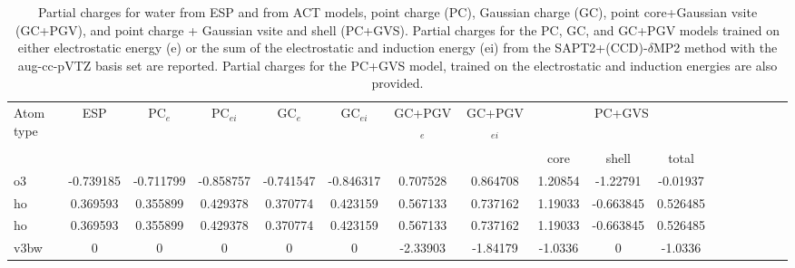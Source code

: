 \begin{sidewaystable}
\caption{Partial charges for water from ESP and from ACT models, point charge (PC), Gaussian charge (GC), point core+Gaussian vsite (GC+PGV), and point charge + Gaussian vsite and shell (PC+GVS).  Partial charges for the PC, GC, and GC+PGV models trained on either electrostatic energy (e) or the sum of the electrostatic and induction energy (ei) from the SAPT2+(CCD)-$\delta$MP2 method with the aug-cc-pVTZ basis set are reported. Partial charges for the PC+GVS model, trained on the electrostatic and induction energies are also provided.}
\hspace{-1cm}
\begin{tabular}{lcccccccccccccccc}
\hline
 Atom type & ESP & PC$_{e}$ & PC$_{ei}$ & GC$_{e}$ & GC$_{ei}$ & GC+PGV$_{e}$ & GC+PGV$_{ei}$ & \multicolumn{3}{c}{PC+GVS} \\\\
 & & & & & & & & core & shell & total \\
\hline
 o3 & -0.739185 & -0.711799 & -0.858757 & -0.741547 &  -0.846317 & 0.707528 &  0.864708 & 1.20854 & -1.22791 & -0.01937 \\
 ho & 0.369593 & 0.355899 & 0.429378 & 0.370774 &  0.423159 & 0.567133 &  0.737162 & 1.19033 & -0.663845 & 0.526485 \\
 ho & 0.369593 & 0.355899 & 0.429378 & 0.370774 &  0.423159 & 0.567133 &  0.737162 & 1.19033 & -0.663845 & 0.526485 \\
 v3bw & 0 & 0 & 0 & 0 & 0 & -2.33903 & -1.84179 & -1.0336 & 0 & -1.0336 \\
\hline
\end{tabular}
\end{sidewaystable}
